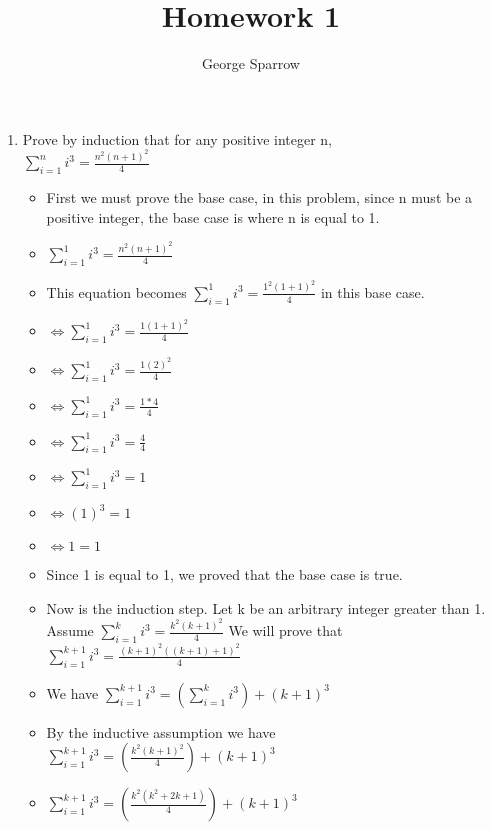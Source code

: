 \documentclass{article}
\title{Homework 1}
\date{\mydate}
\author{George Sparrow}
\begin{document}
\maketitle
\newpage

\begin{enumerate}
\item Prove by induction that for any positive integer n, \\
  {\Large $\sum\limits_{i=1}^{n}i^{3}=\frac{n^{2}(n+1)^{2}}{4}$}
    \begin{itemize}
    \item [] First we must prove the base case, in this problem, since n must be a positive integer, the base case is where n is equal to 1.
    \item [] {\Large $\sum\limits_{i=1}^{1}i^{3}=\frac{n^{2}(n+1)^{2}}{4}$}
    \item [] This equation becomes {\Large $\sum\limits_{i=1}^{1}i^{3}=\frac{1^{2}(1+1)^{2}}{4}$} in this base case.
    \item [] {\Large $\Leftrightarrow \sum\limits_{i=1}^{1}i^{3}=\frac{1(1+1)^{2}}{4}$}
    \item [] {\Large $\Leftrightarrow \sum\limits_{i=1}^{1}i^{3}=\frac{1(2)^{2}}{4}$}
    \item [] {\Large $\Leftrightarrow \sum\limits_{i=1}^{1}i^{3}=\frac{1*4}{4}$}
    \item [] {\Large $\Leftrightarrow \sum\limits_{i=1}^{1}i^{3}=\frac{4}{4}$}
    \item [] $\Leftrightarrow \sum\limits_{i=1}^{1}i^{3}=1$
    \item [] $\Leftrightarrow (1)^{3}=1$
    \item [] $\Leftrightarrow 1=1$
    \item Since 1 is equal to 1, we proved that the base case is true.
    \item Now is the induction step. Let k be an arbitrary integer greater than 1. Assume {\Large $\sum\limits_{i=1}^{k}i^{3}=\frac{k^{2}(k+1)^{2}}{4}$} We will prove that {\Large $\sum\limits_{i=1}^{k+1}i^{3}=\frac{(k+1)^{2}((k+1)+1)^{2}}{4}$}
    \item We have {\Large $\sum\limits_{i=1}^{k+1}i^{3}=\left( \sum\limits_{i=1}^{k}i^{3} \right) + (k+1)^{3}$}
    \item By the inductive assumption we have {\Large $\sum\limits_{i=1}^{k+1}i^{3}=\left(\frac{k^{2}(k+1)^{2}}{4} \right) + (k+1)^{3}$}
    \item [] {\Large $\sum\limits_{i=1}^{k+1}i^{3}=\left(\frac{k^{2}(k^{2}+2k+1)}{4} \right) + (k+1)^{3}$}

\end{itemize}
\end{enumerate}
\end{document}
